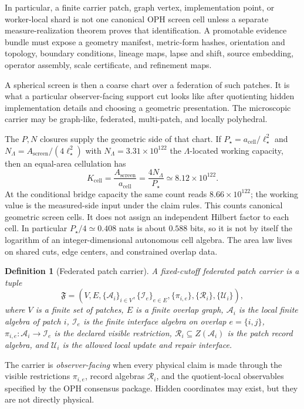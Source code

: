 \documentclass[11pt]{article}
\newtheorem{definition}[theorem]{Definition}
\theoremstyle{remark}
\theoremstyle{plain}
\begin{document}
In particular, a finite carrier patch, graph vertex, implementation point, or
worker-local shard is not one canonical OPH screen cell unless a separate
measure-realization theorem proves that identification. A promotable evidence
bundle must expose a geometry manifest, metric-form hashes, orientation and
topology, boundary conditions, lineage maps, lapse and shift, source embedding,
operator assembly, scale certificate, and refinement maps.

A spherical screen is then a coarse chart over a federation of such patches. It is what a
particular observer-facing support cut looks like after quotienting hidden implementation details
and choosing a geometric presentation. The microscopic carrier may be graph-like, federated,
multi-patch, and locally polyhedral.

The \(P,N\) closures supply the geometric side of that chart. If
\(P_\star=a_{\mathrm{cell}}/\ell_\star^2\) and \(N_\Lambda=A_{\mathrm{screen}}/(4\ell_\star^2)\)
with \(N_\Lambda=3.31\times10^{122}\) the \(\Lambda\)-located working capacity,
then an equal-area cellulation has
\[
K_{\mathrm{cell}}
=\frac{A_{\mathrm{screen}}}{a_{\mathrm{cell}}}
=\frac{4N_\Lambda}{P_\star}
\simeq 8.12\times10^{122}.
\]
At the conditional bridge capacity the same count reads \(8.66\times10^{122}\); the working value
is the measured-side input under the claim rules.
This counts canonical geometric screen cells. It does not assign an independent Hilbert factor to
each cell. In particular \(P_\star/4\simeq0.408\) nats is about \(0.588\) bits, so it is not by
itself the logarithm of an integer-dimensional autonomous cell algebra. The area law lives on shared
cuts, edge centers, and constrained overlap data.

\begin{definition}[Federated patch carrier]
A fixed-cutoff federated patch carrier is a tuple
\[
\mathfrak F=(V,E,\{\mathcal A_i\}_{i\in V},\{\mathcal I_e\}_{e\in E},
\{\pi_{i,e}\},\{\mathcal R_i\},\{\mathcal U_i\}),
\]
where \(V\) is a finite set of patches, \(E\) is a finite overlap graph,
\(\mathcal A_i\) is the local finite algebra of patch \(i\), \(\mathcal I_e\) is the finite
interface algebra on overlap \(e=\{i,j\}\), \(\pi_{i,e}:\mathcal A_i\to\mathcal I_e\) is the
declared visible restriction, \(\mathcal R_i\subseteq Z(\mathcal A_i)\) is the patch record
algebra, and \(\mathcal U_i\) is the allowed local update and repair interface.
\end{definition}

The carrier is \emph{observer-facing} when every physical claim is made through the visible
restrictions \(\pi_{i,e}\), record algebras \(\mathcal R_i\), and the quotient-local observables
specified by the OPH consensus package. Hidden coordinates may exist, but they are not directly
physical.
\end{document}
